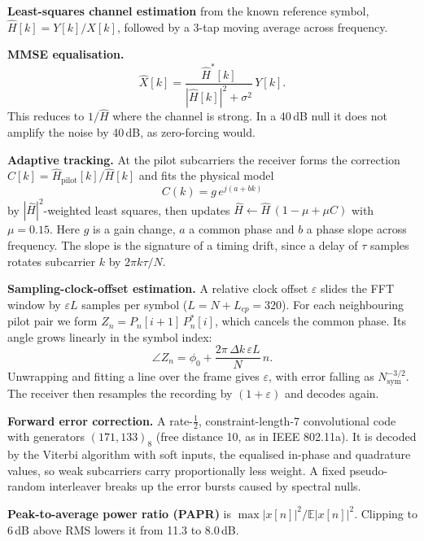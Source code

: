 \documentclass[11pt,a4paper]{report}
\begin{document}
\textbf{Least-squares channel estimation} from the known reference symbol,
$\hat H[k]=Y[k]/X[k]$, followed by a 3-tap moving average across frequency.

\label{sec:mmse}\textbf{MMSE equalisation.}
\begin{equation}
\hat X[k] = \frac{\hat H^*[k]}{|\hat H[k]|^2+\sigma^2}\,Y[k].
\end{equation}
This reduces to $1/\hat H$ where the channel is strong. In a 40\,dB null it does not
amplify the noise by 40\,dB, as zero-forcing would.

\textbf{Adaptive tracking.} At the pilot subcarriers the receiver forms the
correction $C[k]=\hat H_{\text{pilot}}[k]/\hat H[k]$ and fits the physical model
\begin{equation}
C(k) = g\,e^{j(a+bk)}
\end{equation}
by $|\hat H|^2$-weighted least squares, then updates
$\hat H\leftarrow \hat H\,(1-\mu+\mu C)$ with $\mu=0.15$. Here $g$ is a gain change,
$a$ a common phase and $b$ a phase slope across frequency. The slope is the
signature of a timing drift, since a delay of $\tau$ samples rotates subcarrier $k$
by $2\pi k\tau/N$.

\textbf{Sampling-clock-offset estimation.} A relative clock offset $\varepsilon$
slides the FFT window by $\varepsilon L$ samples per symbol ($L=N+L_{cp}=320$). For
each neighbouring pilot pair we form
$Z_n = P_n[i+1]\,P_n^*[i]$, which cancels the common phase. Its angle grows linearly
in the symbol index:
\begin{equation}
\angle Z_n = \phi_0 + \frac{2\pi\,\Delta k\,\varepsilon L}{N}\,n .
\end{equation}
Unwrapping and fitting a line over the frame gives $\varepsilon$, with error falling
as $N_{\text{sym}}^{-3/2}$. The receiver then resamples the recording by
$(1+\varepsilon)$ and decodes again.

\textbf{Forward error correction.} A rate-$\tfrac12$, constraint-length-7
convolutional code with generators $(171,133)_8$ (free distance 10, as in IEEE
802.11a). It is decoded by the Viterbi algorithm with soft inputs, the equalised
in-phase and quadrature values, so weak subcarriers carry proportionally less weight.
A fixed pseudo-random interleaver breaks up the error bursts caused by spectral nulls.

\textbf{Peak-to-average power ratio (PAPR)} is
$\max|x[n]|^2/\mathbb{E}|x[n]|^2$. Clipping to 6\,dB above RMS lowers it from
11.3 to 8.0\,dB.
\end{document}
